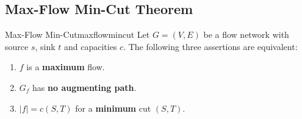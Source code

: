 \subsection{Max-Flow Min-Cut Theorem}

\begin{theorem}{Max-Flow Min-Cut}{maxflowmincut}
Let $G = (V, E)$ be a flow network with source $s$, sink $t$ and capacities $c$.
The following three assertions are equivalent:
\begin{enumerate}
  \item $f$ is a \textbf{maximum} flow.
  \item $G_f$ has \textbf{no augmenting path}.
  \item $|f| = c(S, T)$ for a \textbf{minimum} cut $(S, T)$.
\end{enumerate}
\end{theorem}

